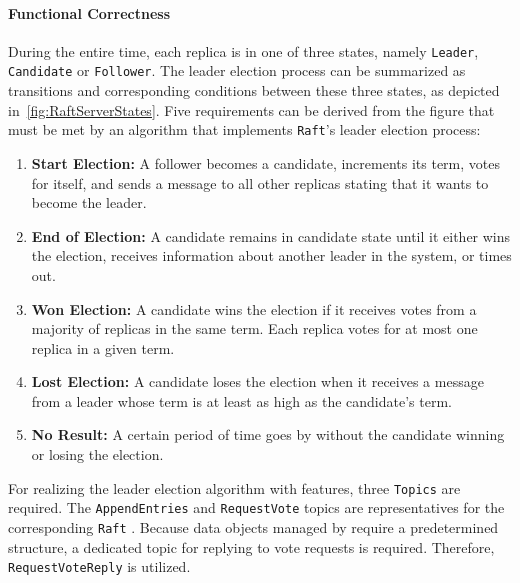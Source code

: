 \paragraph{Functional Correctness}
During the entire time, each replica is in one of three states, namely \texttt{Leader}, \texttt{Candidate} or \texttt{Follower}.
The leader election process can be summarized as transitions and corresponding conditions between these three states, as depicted in~\autoref{fig:RaftServerStates}.
Five requirements can be derived from the figure that must be met by an algorithm that implements \texttt{Raft}'s leader election process:

\begin{enumerate}
\item \textbf{Start Election:} A follower becomes a candidate, increments its term, votes for itself, and sends a message to all other replicas stating that it wants to become the leader.
\item \textbf{End of Election:} A candidate remains in candidate state until it either wins the election, receives information about another leader in the system, or times out.
\item \textbf{Won Election:} A candidate wins the election if it receives votes from a majority of replicas in the same term. Each replica votes for at most one replica in a given term.
\item \textbf{Lost Election:} A candidate loses the election when it receives a message from a leader whose term is at least as high as the candidate's term.
\item \textbf{No Result:} A certain period of time goes by without the candidate winning or losing the election.
\end{enumerate}

\noindent
For realizing the leader election algorithm with  features, three \texttt{Topics} are required.
The \texttt{AppendEntries} and \texttt{RequestVote} topics are representatives for the corresponding \texttt{Raft} .
Because data objects managed by  require a predetermined structure, a dedicated topic for replying to vote requests is required.
Therefore, \texttt{RequestVoteReply} is utilized.

